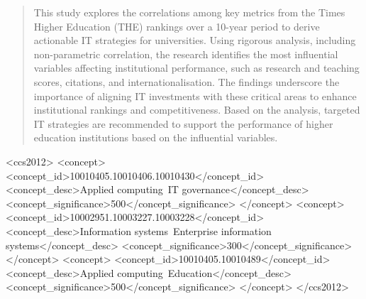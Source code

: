 \documentclass[sigconf]{acmart}
\begin{document}


\begin{abstract}
	This study explores the correlations among key metrics from the Times Higher Education (THE) rankings over a 10-year period to derive actionable IT strategies for universities. Using rigorous analysis, including non-parametric correlation, the research identifies the most influential variables affecting institutional performance, such as research and teaching scores, citations, and internationalisation. The findings underscore the importance of aligning IT investments with these critical areas to enhance institutional rankings and competitiveness. Based on the analysis, targeted IT strategies are recommended to support the performance of higher education institutions based on the influential variables.
\end{abstract}

\begin{CCSXML}
	<ccs2012>
	<concept>
	<concept_id>10010405.10010406.10010430</concept_id>
	<concept_desc>Applied computing~IT governance</concept_desc>
	<concept_significance>500</concept_significance>
	</concept>
	<concept>
	<concept_id>10002951.10003227.10003228</concept_id>
	<concept_desc>Information systems~Enterprise information systems</concept_desc>
	<concept_significance>300</concept_significance>
	</concept>
	<concept>
	<concept_id>10010405.10010489</concept_id>
	<concept_desc>Applied computing~Education</concept_desc>
	<concept_significance>500</concept_significance>
	</concept>
	</ccs2012>
\end{CCSXML}

\end{document}
